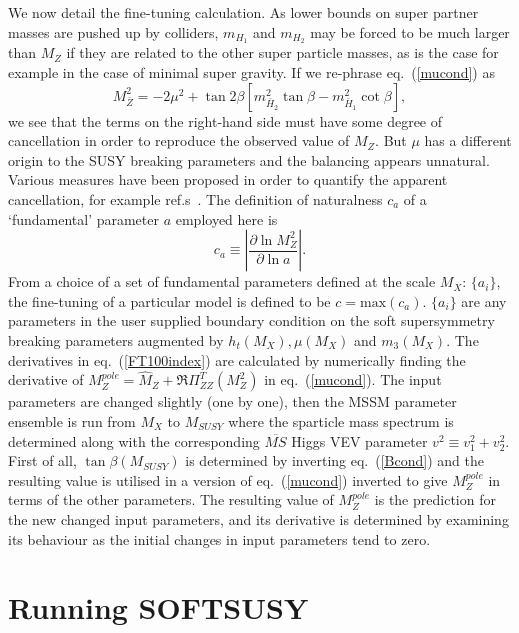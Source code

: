 \documentclass{article}
\begin{document}
We now detail the fine-tuning calculation. 
As lower bounds on super partner masses are pushed up by colliders,
$m_{H_1}$ and $m_{H_2}$ may be forced to be much larger than $M_Z$ if they are
related to the other super particle masses, as is the case
for example in the case of 
minimal super gravity. 
If we re-phrase eq.~(\ref{mucond}) as
\begin{equation}
M_{\bar Z}^2  = -2
\mu^2 + \tan 2\beta \left[m_{\bar{H}_2}^2\tan \beta
- m_{\bar{H}_1}^2  \cot \beta \right],
\end{equation}
we see that the terms on the right-hand side must have 
some degree of cancellation in order to reproduce the 
observed value of $M_Z$.
But $\mu$ has a different origin to the SUSY breaking parameters and the
balancing appears unnatural. Various measures have
been proposed in order to quantify the apparent cancellation, for
example ref.s~\cite{Barbieri:1998uv,deCarlos:1993yy}.
The definition of naturalness $c_a$ 
of a `fundamental' parameter $a$ employed here is~\cite{deCarlos:1993yy} 
\begin{equation}
c_a \equiv \left| \frac{\partial \ln M_Z^2}{\partial \ln a} \right|.
\label{FT100index}
\end{equation}
From a choice of a set of fundamental parameters defined at the scale $M_X$:
$\{ a_i \}$, the 
fine-tuning of a particular model is defined to be $c=\mbox{max}(c_a)$.
$\{ a_i \}$ are any parameters in the user supplied boundary condition on the
soft supersymmetry breaking parameters augmented by $h_t(M_X), \mu(M_X)$ and
$m_3(M_X)$. The derivatives in eq.~(\ref{FT100index}) are calculated by 
numerically finding the derivative of $M_Z^{pole}=\hat M_Z +
\Re\Pi_{ZZ}^T(M_Z^2)$ in eq.~(\ref{mucond}). 
The input parameters are
changed slightly (one by one), then the MSSM parameter ensemble is run from 
$M_X$ to $M_{SUSY}$ where the sparticle mass spectrum is determined along with the
corresponding $\overline{MS}$ Higgs VEV parameter
$v^2 \equiv v_1^2 + v_2^2$. 
First of all, $\tan \beta(M_{SUSY})$ is determined by inverting
eq.~(\ref{Bcond}) and the resulting value is utilised in a version of
eq.~(\ref{mucond}) inverted to give $M_Z^{pole}$ in terms of the other
parameters.
The resulting value of $M_Z^{pole}$ is the
prediction for the new changed input parameters, and its derivative is
determined by examining its behaviour as the initial changes in input
parameters tend to zero.

\appendix

\section{Running SOFTSUSY}
\label{sec:run}
\end{document}

